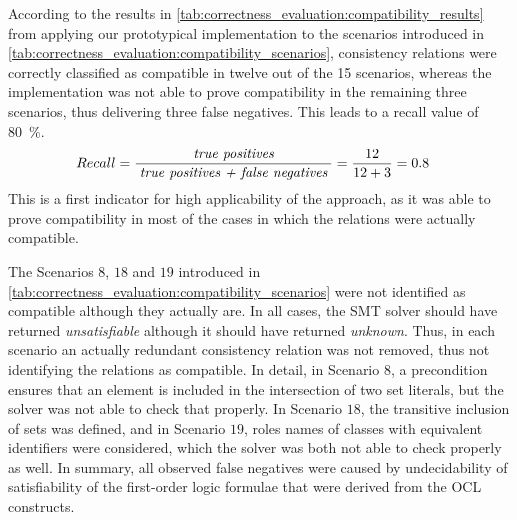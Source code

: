 According to the results in \autoref{tab:correctness_evaluation:compatibility_results} from applying our prototypical implementation to the scenarios introduced in \autoref{tab:correctness_evaluation:compatibility_scenarios}, consistency relations were correctly classified as compatible in twelve out of the 15 scenarios, whereas the implementation was not able to prove compatibility in the remaining three scenarios, thus delivering three false negatives.
This leads to a recall value of \SI{80}{\percent}.
\begin{align*}
    &
    Recall = \frac{\; \textit{true positives} \;}{\; \textit{true positives + false negatives} \;} = \frac{12}{12+3} = 0.8
\end{align*}
%
%
This is a first indicator for high applicability of the approach, as it was able to prove compatibility in most of the cases in which the relations were actually compatible.

The Scenarios $8$, $18$ and $19$ introduced in \autoref{tab:correctness_evaluation:compatibility_scenarios} were not identified as compatible although they actually are.
In all cases, the \gls{SMT} solver should have returned \emph{unsatisfiable} although it should have returned \emph{unknown}.
Thus, in each scenario an actually redundant consistency relation was not removed, thus not identifying the relations as compatible.
In detail, in Scenario $8$, a precondition ensures that an element is included in the intersection of two set literals, but the solver was not able to check that properly.
In Scenario $18$, the transitive inclusion of sets was defined, and in Scenario $19$, roles names of classes with equivalent identifiers were considered, which the solver was both not able to check properly as well.
In summary, all observed false negatives were caused by undecidability of satisfiability of the first-order logic formulae that were derived from the \gls{OCL} constructs.

